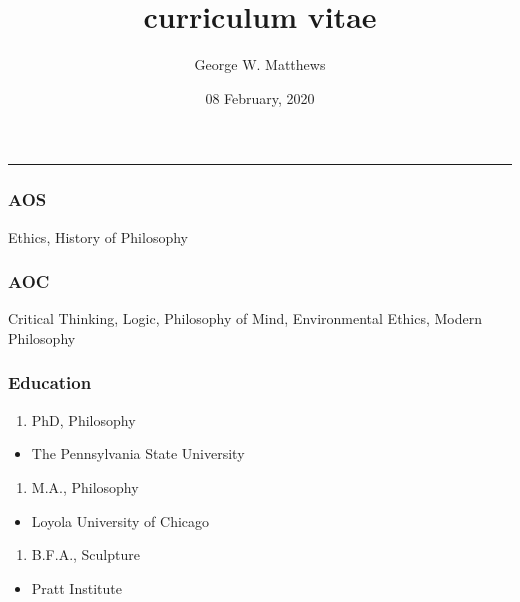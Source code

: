 \documentclass[letterpaper]{article}
\title{curriculum vitae}
\author{George W. Matthews}
\date{08 February, 2020}
\providecommand{\tightlist}{%
  \setlength{\itemsep}{0pt}\setlength{\parskip}{0pt}}
\begin{document}
\maketitle

\begin{center}\rule{0.5\linewidth}{\linethickness}\end{center}

\hypertarget{aos}{%
\subsubsection{AOS}\label{aos}}

Ethics, History of Philosophy

\hypertarget{aoc}{%
\subsubsection{AOC}\label{aoc}}

Critical Thinking, Logic, Philosophy of Mind, Environmental Ethics,
Modern Philosophy

\hypertarget{education}{%
\subsubsection{Education}\label{education}}

\begin{enumerate}
\def\labelenumi{(\arabic{enumi})}
\setcounter{enumi}{1995}
\tightlist
\item
  PhD, Philosophy
\end{enumerate}

\begin{itemize}
\tightlist
\item
  The Pennsylvania State University
\end{itemize}

\begin{enumerate}
\def\labelenumi{(\arabic{enumi})}
\setcounter{enumi}{1989}
\tightlist
\item
  M.A., Philosophy
\end{enumerate}

\begin{itemize}
\tightlist
\item
  Loyola University of Chicago
\end{itemize}

\begin{enumerate}
\def\labelenumi{(\arabic{enumi})}
\setcounter{enumi}{1985}
\tightlist
\item
  B.F.A., Sculpture
\end{enumerate}

\begin{itemize}
\tightlist
\item
  Pratt Institute
\end{itemize}
\end{document}
